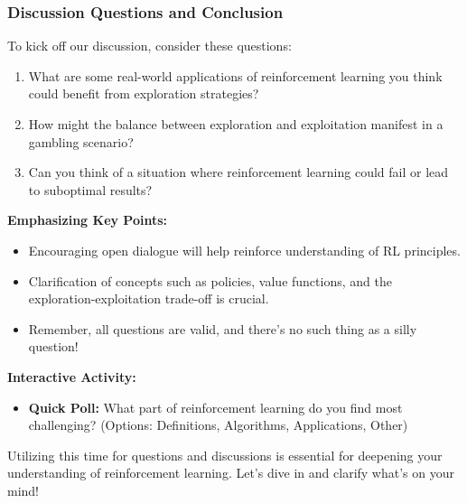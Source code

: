 \documentclass[aspectratio=169]{beamer}
\begin{document}
\begin{frame}[fragile]
  \frametitle{Discussion Questions and Conclusion}
  To kick off our discussion, consider these questions:
  \begin{enumerate}
    \item What are some real-world applications of reinforcement learning you think could benefit from exploration strategies?
    \item How might the balance between exploration and exploitation manifest in a gambling scenario?
    \item Can you think of a situation where reinforcement learning could fail or lead to suboptimal results?
  \end{enumerate}

  \textbf{Emphasizing Key Points:}
  \begin{itemize}
    \item Encouraging open dialogue will help reinforce understanding of RL principles.
    \item Clarification of concepts such as policies, value functions, and the exploration-exploitation trade-off is crucial.
    \item Remember, all questions are valid, and there's no such thing as a silly question!
  \end{itemize}

  \textbf{Interactive Activity:}
  \begin{itemize}
    \item \textbf{Quick Poll:} What part of reinforcement learning do you find most challenging? (Options: Definitions, Algorithms, Applications, Other)
  \end{itemize}

  Utilizing this time for questions and discussions is essential for deepening your understanding of reinforcement learning. Let's dive in and clarify what's on your mind!
\end{frame}
\end{document}

